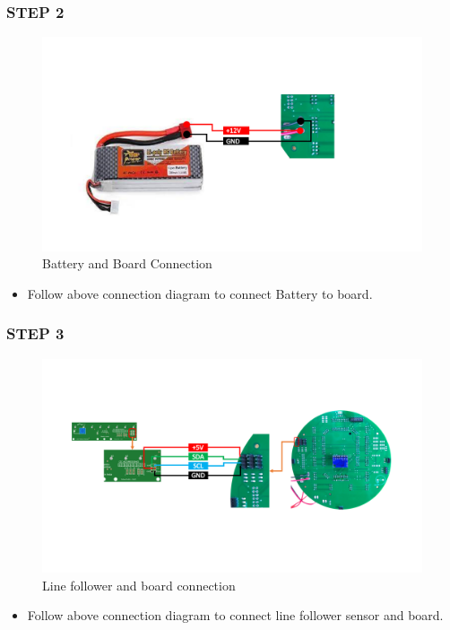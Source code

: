 \documentclass[12pt,a4paper,oneside]{book}
\begin{document}
		\subsubsection*{STEP 2}
				\begin{figure}[H]
					\begin{center}
						\includegraphics[scale=0.50]{Battery_Connection}
						\caption{Battery and Board Connection}
					\end{center}
				\end{figure}
				\begin{itemize}
					\item Follow above connection diagram to connect Battery to board.
				\end{itemize}

		\subsubsection*{STEP 3}
				\begin{figure}[H]
					\begin{center}
						\includegraphics[scale=0.50]{LineFollower_connection}
						\caption{Line follower and board connection}
					\end{center}
				\end{figure}
				\begin{itemize}
					\item Follow above connection diagram to connect line follower sensor and board.
				\end{itemize}
\end{document}
